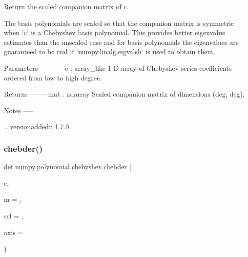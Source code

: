 \begin{DoxyVerb}Return the scaled companion matrix of c.

The basis polynomials are scaled so that the companion matrix is
symmetric when `c` is a Chebyshev basis polynomial. This provides
better eigenvalue estimates than the unscaled case and for basis
polynomials the eigenvalues are guaranteed to be real if
`numpy.linalg.eigvalsh` is used to obtain them.

Parameters
----------
c : array_like
    1-D array of Chebyshev series coefficients ordered from low to high
    degree.

Returns
-------
mat : ndarray
    Scaled companion matrix of dimensions (deg, deg).

Notes
-----

.. versionadded:: 1.7.0\end{DoxyVerb}
 \mbox{\label{namespacenumpy_1_1polynomial_1_1chebyshev_a9bfa98102b617d06df5d0e872a7a00b9}} 
\subsubsection{\texorpdfstring{chebder()}{chebder()}}
{\footnotesize\ttfamily def numpy.\+polynomial.\+chebyshev.\+chebder (\begin{DoxyParamCaption}\item[{}]{c,  }\item[{}]{m = {},  }\item[{}]{scl = {},  }\item[{}]{axis = {} }\end{DoxyParamCaption})}

